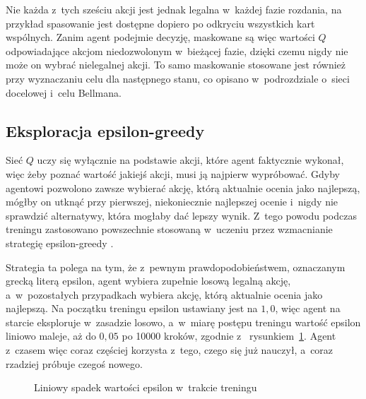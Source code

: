 Nie każda z~tych sześciu akcji jest jednak legalna w~każdej fazie
rozdania, na przykład spasowanie jest dostępne dopiero po odkryciu
wszystkich kart wspólnych. Zanim agent podejmie decyzję, maskowane są więc
wartości $Q$ odpowiadające akcjom niedozwolonym w~bieżącej fazie, dzięki
czemu nigdy nie może on wybrać nielegalnej akcji. To samo maskowanie
stosowane jest również przy wyznaczaniu celu dla następnego stanu, co opisano
w~podrozdziale o~sieci docelowej i~celu Bellmana.

\subsection{Eksploracja epsilon-greedy}

Sieć $Q$ uczy się wyłącznie na podstawie akcji, które agent faktycznie
wykonał, więc żeby poznać wartość jakiejś akcji, musi ją najpierw
wypróbować. Gdyby agentowi pozwolono zawsze wybierać akcję, którą
aktualnie ocenia jako najlepszą, mógłby on utknąć przy pierwszej,
niekoniecznie najlepszej ocenie i~nigdy nie sprawdzić alternatywy, która
mogłaby dać lepszy wynik. Z~tego powodu podczas treningu
zastosowano powszechnie stosowaną w~uczeniu przez wzmacnianie strategię
epsilon-greedy \cite{epsilon_greedy}.

Strategia ta polega na tym, że z~pewnym prawdopodobieństwem, oznaczanym
grecką literą epsilon, agent wybiera zupełnie losową legalną akcję,
a~w~pozostałych przypadkach wybiera akcję, którą aktualnie ocenia jako
najlepszą. Na początku treningu epsilon ustawiany jest na $1{,}0$, więc agent
na starcie eksploruje w~zasadzie losowo, a~w~miarę postępu treningu
wartość epsilon liniowo maleje, aż do $0{,}05$ po 10000 kroków, zgodnie z~
rysunkiem~\ref{fig:epsilon-decay}. Agent z~czasem więc
coraz częściej korzysta z~tego, czego się już nauczył, a~coraz rzadziej
próbuje czegoś nowego.

\begin{figure}[htbp]
    \centering
    \caption{Liniowy spadek wartości epsilon w~trakcie treningu}
    \label{fig:epsilon-decay}
\end{figure}

